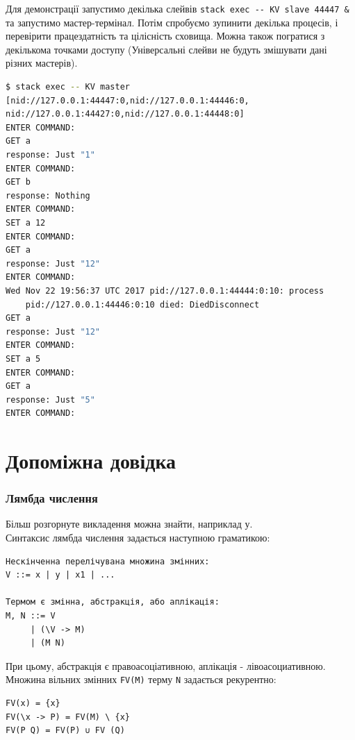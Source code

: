 \documentclass[12pt]{article}
\begin{document}
Для демонстрації запустимо декілька слейвів \lstinline{stack exec -- KV slave 44447 &} та запустимо 
мастер-термінал. Потім спробуємо зупинити декілька процесів, і перевірити працездатність та цілісність 
сховища. Можна також погратися з декількома точками доступу (Універсальні слейви не будуть змішувати дані різних мастерів).\\

\begin{lstlisting}[language=bash, caption=Приклад сесії]
$ stack exec -- KV master
[nid://127.0.0.1:44447:0,nid://127.0.0.1:44446:0,
nid://127.0.0.1:44427:0,nid://127.0.0.1:44448:0]
ENTER COMMAND:
GET a
response: Just "1"
ENTER COMMAND:
GET b
response: Nothing
ENTER COMMAND:
SET a 12
ENTER COMMAND:
GET a
response: Just "12"
ENTER COMMAND:
Wed Nov 22 19:56:37 UTC 2017 pid://127.0.0.1:44444:0:10: process
    pid://127.0.0.1:44446:0:10 died: DiedDisconnect
GET a
response: Just "12"
ENTER COMMAND:
SET a 5
ENTER COMMAND:
GET a
response: Just "5"
ENTER COMMAND:

\end{lstlisting}


\section{Допоміжна довідка}

\subsubsection*{Лямбда числення}

Більш розгорнуте викладення можна знайти, наприклад у\cite{lambdaMoskvin}.\\

Синтаксис лямбда числення задається наступною граматикою:
\begin{lstlisting}[caption={Синтаксис простого безтипового лямбда числення}]
Нескінченна перелічувана множина змінних:
V ::= x | y | x1 | ... 

Термом є змінна, абстракція, або аплікація:
M, N ::= V
     | (\V -> M)
     | (M N)
\end{lstlisting}

При цьому, абстракція є правоасоціативною, аплікація - лівоасоциативною.\\

Множина вільних змінних \lstinline{FV(M)} терму \lstinline{N} задається рекурентно:\\
\begin{lstlisting}[caption={Вільні змінні}]
FV(x) = {x}
FV(\x -> P) = FV(M) \ {x}
FV(P Q) = FV(P) ∪ FV (Q)
\end{lstlisting}
\end{document}
